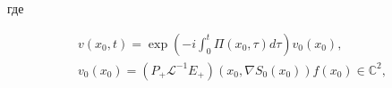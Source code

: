 \documentclass[10pt]{article}
\begin{document}
где



\[

\begin{gathered}

v\left(x_{0}, t\right)=\exp \left(-i \int_{0}^{t} \Pi\left(x_{0}, \tau\right) d \tau\right) v_{0}\left(x_{0}\right), \\

v_{0}\left(x_{0}\right)=\left(P_{+} \mathscr{L}^{-1} E_{+}\right)\left(x_{0}, \nabla S_{0}\left(x_{0}\right)\right) f\left(x_{0}\right) \in \mathbb{C}^{2},

\end{gathered}

\]
\end{document}
